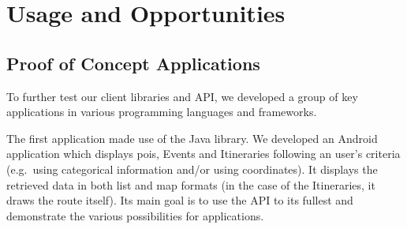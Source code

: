 \documentclass[times,doublespace]{ettauth}%
\begin{document}
\section{Usage and Opportunities}
\label{s:evaluation}


\subsection{Proof of Concept Applications}
To further test our client libraries and API, we developed a group of key applications in various programming languages and frameworks.

The first application made use of the Java library. 
We developed an Android application which displays \acp{poi}, Events and Itineraries following an user's criteria (e.g.\  using categorical information and/or using coordinates). 
It displays the retrieved data in both list and map formats (in the case of the Itineraries, it draws the route itself). 
Its main goal is to use the API to its fullest and demonstrate the various possibilities for applications.
\end{document}
